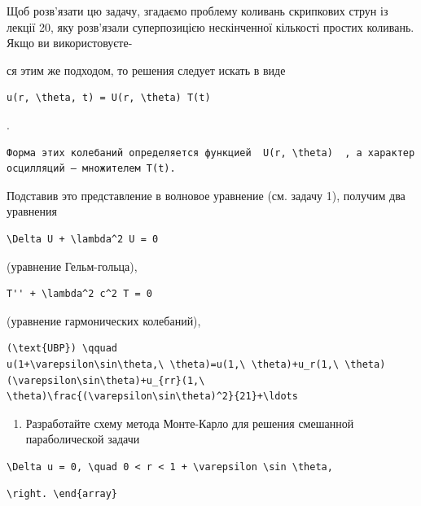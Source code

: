 \documentclass[
  ukrainian,
]{article}
\providecommand{\tightlist}{%
  \setlength{\itemsep}{0pt}\setlength{\parskip}{0pt}}
\begin{document}
Щоб розв'язати цю задачу, згадаємо проблему коливань скрипкових струн із
лекції 20, яку розв'язали суперпозицією нескінченної кількості простих
коливань. Якщо ви використовуєте-

ся этим же подходом, то решения следует искать в виде

\begin{verbatim}
u(r, \theta, t) = U(r, \theta) T(t)
\end{verbatim}

.

\begin{verbatim}
Форма этих колебаний определяется функцией  U(r, \theta)  , а характер осцилляций — множителем T(t).
\end{verbatim}

Подставив это представление в волновое уравнение (см. задачу 1), получим
два уравнения

\begin{verbatim}
\Delta U + \lambda^2 U = 0
\end{verbatim}

(уравнение Гельм-гольца),

\begin{verbatim}
T'' + \lambda^2 c^2 T = 0
\end{verbatim}

(уравнение гармонических колебаний),

\begin{verbatim}
(\text{UBP}) \qquad
u(1+\varepsilon\sin\theta,\ \theta)=u(1,\ \theta)+u_r(1,\ \theta)(\varepsilon\sin\theta)+u_{rr}(1,\ \theta)\frac{(\varepsilon\sin\theta)^2}{21}+\ldots
\end{verbatim}

\begin{enumerate}
\def\labelenumi{\arabic{enumi}.}
\setcounter{enumi}{4}
\tightlist
\item
  Разработайте схему метода Монте-Карло для решения смешанной
  параболической задачи
\end{enumerate}

\begin{verbatim}
\Delta u = 0, \quad 0 < r < 1 + \varepsilon \sin \theta,
\end{verbatim}

\begin{verbatim}
\right. \end{array}
\end{verbatim}
\end{document}
